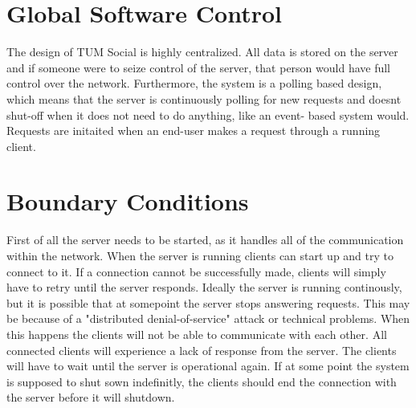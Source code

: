 \documentclass[a4paper,12pt]{scrartcl}
\begin{document}
    \section{Global Software Control}
    
    The design of TUM Social is highly centralized. All data is stored on the server and if someone were to seize control of the server, that person would have full control over the network.
    Furthermore, the system is a polling based design, which means that the server is continuously polling for new requests and doesnt shut-off when it does not need to do anything, like an event-			based system would. Requests are initaited when an end-user makes a request through a running client. 


    \section{Boundary Conditions}
   First of all the server needs to be started, as it handles all of the communication within the network. When the server is running clients can start up and try to connect to it. If a connection cannot be successfully made, clients will simply have to retry until the server responds. Ideally the server is running continously, but it is possible that at somepoint the server stops answering requests. This may be because of a "distributed denial-of-service" attack or technical problems. When this happens the clients will not be able to communicate with each other. All connected clients will experience a lack of response from the server. The clients will have to wait until the server is operational again. If at some point the system is supposed to shut sown indefinitly, the clients should end the connection with the server before it will shutdown.\\
\end{document}
